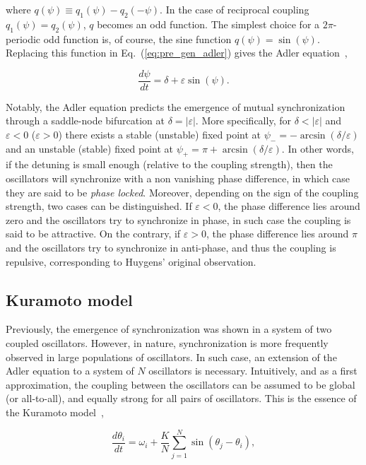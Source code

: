\noindent where $q(\psi) \equiv q_1(\psi) - q_2(-\psi)$. In the case of reciprocal coupling $q_1(\psi) = q_2(\psi)$,
$q$ becomes an odd function. The simplest choice for a $2\pi$-periodic odd function is, of course, 
the sine function $q(\psi) = \sin(\psi)$. Replacing this function in Eq.~(\ref{eq:pre_gen_adler})
gives the Adler equation~\cite{adler1946study},

\begin{equation}
    \dfrac{d\psi}{dt} = \delta + \varepsilon \sin(\psi).
    \label{eq:pre_adler}
\end{equation}

Notably, the Adler equation predicts the emergence of mutual synchronization through a saddle-node
bifurcation at $\delta = |\varepsilon|$. More specifically, for $\delta < |\varepsilon|$
and $\varepsilon < 0$ ($\varepsilon > 0$) there exists 
a stable (unstable) fixed point at $\psi_{-} = -\arcsin(\delta/\varepsilon)$ and an unstable (stable)
fixed point at $\psi_{+} = \pi + \arcsin(\delta/\varepsilon)$. In other words, if the detuning
is small enough (relative to the coupling strength), then the oscillators will synchronize with
a non vanishing phase difference, in which case they are said to be {\em phase locked}. Moreover,
depending on the sign of the coupling strength, two cases can be distinguished. If $\varepsilon < 0$,
the phase difference lies around zero and the oscillators try to synchronize in phase, in such
case the coupling is said to be attractive. On the contrary,  if $\varepsilon > 0$, the phase difference
lies around $\pi$ and the oscillators try to synchronize in anti-phase, and thus the coupling is
repulsive, corresponding to Huygens' original observation.


\subsection{Kuramoto model}

Previously, the emergence of synchronization was shown in a system of two coupled oscillators.
However, in nature, synchronization is more frequently observed in large populations of oscillators. In such case,
an extension of the Adler equation to a system of $N$ oscillators is necessary. Intuitively,
and as a first approximation, the coupling between the oscillators can be assumed to be global (or all-to-all),
and equally strong for all pairs of oscillators. This is the essence of the Kuramoto 
model~\cite{kuramoto1975model,kuramoto1984chemical},

\begin{equation}
    \dfrac{d\theta_i}{dt} = \omega_i + \dfrac{K}{N} \sum_{j=1}^{N} \sin(\theta_j - \theta_i),
    \label{eq:pre_kuramoto}
\end{equation}

